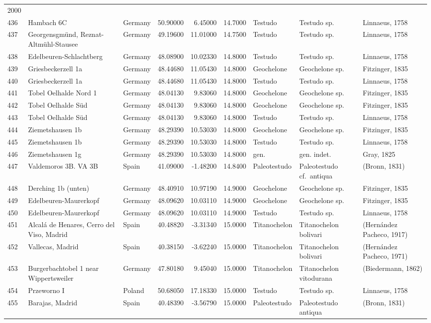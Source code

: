 \begin{landscape}
{\begin{longtable}[]{@{}lllrrrlll@{}}
2000\tabularnewline
436 & Hambach 6C & Germany & 50.90000 & 6.45000 & 14.7000 & Testudo &
Testudo sp. & Linnaeus, 1758\tabularnewline
437 & Georgensgmünd, Reznat-Altmühl-Stausee & Germany & 49.19600 &
11.01000 & 14.7500 & Testudo & Testudo sp. & Linnaeus,
1758\tabularnewline
438 & Edelbeuren-Schlachtberg & Germany & 48.08900 & 10.02330 & 14.8000
& Testudo & Testudo sp. & Linnaeus, 1758\tabularnewline
439 & Griesbeckerzell 1a & Germany & 48.44680 & 11.05430 & 14.8000 &
Geochelone & Geochelone sp. & Fitzinger, 1835\tabularnewline
440 & Griesbeckerzell 1a & Germany & 48.44680 & 11.05430 & 14.8000 &
Testudo & Testudo sp. & Linnaeus, 1758\tabularnewline
441 & Tobel Oelhalde Nord 1 & Germany & 48.04130 & 9.83060 & 14.8000 &
Geochelone & Geochelone sp. & Fitzinger, 1835\tabularnewline
442 & Tobel Oelhalde Süd & Germany & 48.04130 & 9.83060 & 14.8000 &
Geochelone & Geochelone sp. & Fitzinger, 1835\tabularnewline
443 & Tobel Oelhalde Süd & Germany & 48.04130 & 9.83060 & 14.8000 &
Testudo & Testudo sp. & Linnaeus, 1758\tabularnewline
444 & Ziemetshausen 1b & Germany & 48.29390 & 10.53030 & 14.8000 &
Geochelone & Geochelone sp. & Fitzinger, 1835\tabularnewline
445 & Ziemetshausen 1b & Germany & 48.29390 & 10.53030 & 14.8000 &
Testudo & Testudo sp. & Linnaeus, 1758\tabularnewline
446 & Ziemetshausen 1g & Germany & 48.29390 & 10.53030 & 14.8000 & gen.
& gen. indet. & Gray, 1825\tabularnewline
447 & Valdemoros 3B. VA 3B & Spain & 41.09000 & -1.48200 & 14.8400 &
Paleotestudo & Paleotestudo cf.~antiqua & (Bronn, 1831)\tabularnewline
448 & Derching 1b (unten) & Germany & 48.40910 & 10.97190 & 14.9000 &
Geochelone & Geochelone sp. & Fitzinger, 1835\tabularnewline
449 & Edelbeuren-Maurerkopf & Germany & 48.09620 & 10.03110 & 14.9000 &
Geochelone & Geochelone sp. & Fitzinger, 1835\tabularnewline
450 & Edelbeuren-Maurerkopf & Germany & 48.09620 & 10.03110 & 14.9000 &
Testudo & Testudo sp. & Linnaeus, 1758\tabularnewline
451 & Alcalá de Henares, Cerro del Viso, Madrid & Spain & 40.48820 & -3.31340 & 15.0000 &
Titanochelon & Titanochelon bolivari & (Hernández Pacheco,
1917)\tabularnewline
452 & Vallecas, Madrid & Spain & 40.38150 & -3.62240 & 15.0000 &
Titanochelon & Titanochelon bolivari & (Hernández Pacheco,
1971)\tabularnewline
453 & Burgerbachtobel 1 near Wippertsweiler & Germany & 47.80180 &
9.45040 & 15.0000 & Titanochelon & Titanochelon vitodurana &
(Biedermann, 1862)\tabularnewline
454 & Przeworno I & Poland & 50.68050 & 17.18330 & 15.0000 & Testudo &
Testudo sp. & Linnaeus, 1758\tabularnewline
455 & Barajas, Madrid & Spain & 40.48390 & -3.56790 & 15.0000 &
Paleotestudo & Paleotestudo antiqua & (Bronn, 1831)\tabularnewline

\end{longtable}}
\end{landscape}
